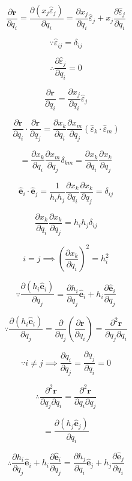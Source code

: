 \documentclass[12pt]{article}
\begin{document}
\[
    \frac{\partial \textbf{r}}{\partial q_i} = \frac{\partial (x_j \hat{\varepsilon}_j)}{\partial q_i}
    = \frac{\partial x_j}{\partial q_i} \hat{\varepsilon}_j + x_j \frac{\partial \hat{\varepsilon}_j}{\partial q_i}
\]

\[
    \because  \hat{\varepsilon}_{ij} = \delta_{ij}
\]

\[
    \therefore \frac{\partial \hat{\varepsilon}_j}{\partial q_i} = 0
\]

\[
    \frac{\partial \textbf{r}}{\partial q_i} = \frac{\partial x_j}{\partial q_i} \hat{\varepsilon}_j
\]

\[
    \frac{\partial \textbf{r}}{\partial q_i} \cdot \frac{\partial \textbf{r}}{\partial q_j}
    = \frac{\partial x_k}{\partial q_i} \frac{\partial x_m}{\partial q_j}
    \left(\hat{\varepsilon}_k \cdot \hat{\varepsilon}_m\right)
\]

\[
    = \frac{\partial x_k}{\partial q_i} \frac{\partial x_m}{\partial q_j} \delta_{km}
    = \frac{\partial x_k}{\partial q_i} \frac{\partial x_k}{\partial q_j}
\]

\[
    \hat{\mathbf{e}}_i \cdot \hat{\mathbf{e}}_j
    = \frac{1}{h_i h_j} \frac{\partial x_k}{\partial q_i} \frac{\partial x_k}{\partial q_j} = \delta_{ij}
\]

\[
    \frac{\partial x_k}{\partial q_i} \frac{\partial x_k}{\partial q_j} = h_i h_j \delta_{ij}
\]

\[
    i = j \implies {\left(\frac{\partial x_k}{\partial q_i}\right)}^2 = h_i^2
\]

\[
    \because \frac{\partial (h_i \hat{\mathbf{e}}_i)}{\partial q_j}
    = \frac{\partial h_i}{\partial q_j} \hat{\mathbf{e}}_i
    + h_i \frac{\partial \hat{\mathbf{e}}_i}{\partial q_j}
\]

\[
    \because \frac{\partial (h_i \hat{\mathbf{e}}_i)}{\partial q_j}
    = \frac{\partial}{\partial q_j} \left(\frac{\partial \textbf{r}}{\partial q_i}\right)
    = \frac{\partial^2 \textbf{r}}{\partial q_j \partial q_i}
\]

\[
    \because i \neq j \implies \frac{\partial q_i}{\partial q_j} = \frac{\partial q_j}{\partial q_i} = 0
\]

\[
    \therefore \frac{\partial^2 \textbf{r}}{\partial q_j \partial q_i}
    = \frac{\partial^2 \textbf{r}}{\partial q_i \partial q_j}
\]

\[
    = \frac{\partial (h_j \hat{\mathbf{e}}_j)}{\partial q_i}
\]

\[
    \therefore \frac{\partial h_i}{\partial q_j} \hat{\mathbf{e}}_i
    + h_i \frac{\partial \hat{\mathbf{e}}_i}{\partial q_j}
    = \frac{\partial h_j}{\partial q_i} \hat{\mathbf{e}}_j
    + h_j \frac{\partial \hat{\mathbf{e}}_j}{\partial q_i}
\]
\end{document}
